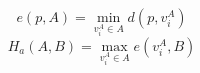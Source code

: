 \begin{equation}
e(p, A) = \min_{v^A_i\in A}{d(p, v^A_i)}
\end{equation}
\begin{equation}
H_a(A,B) = \max_{v^A_i\in A}{e(v^A_i, B)}
\end{equation}
